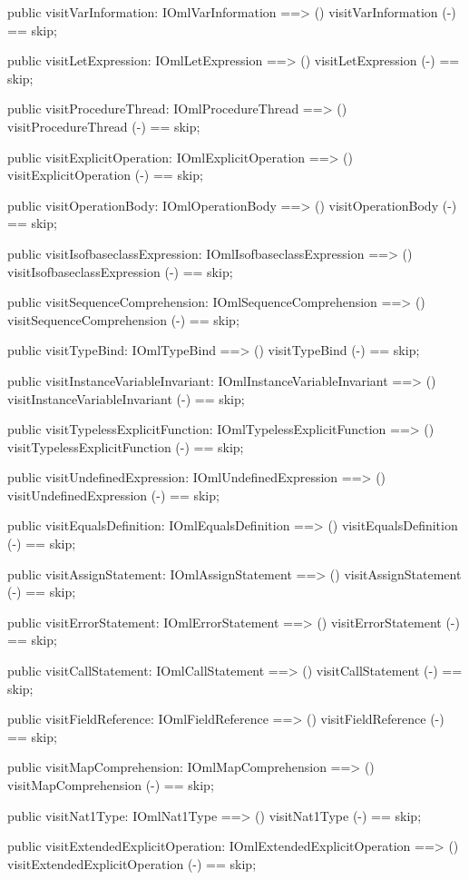 \begin{vdm_al}
  public visitVarInformation: IOmlVarInformation ==> ()
  visitVarInformation (-) == skip;

  public visitLetExpression: IOmlLetExpression ==> ()
  visitLetExpression (-) == skip;

  public visitProcedureThread: IOmlProcedureThread ==> ()
  visitProcedureThread (-) == skip;

  public visitExplicitOperation: IOmlExplicitOperation ==> ()
  visitExplicitOperation (-) == skip;

  public visitOperationBody: IOmlOperationBody ==> ()
  visitOperationBody (-) == skip;

  public visitIsofbaseclassExpression: IOmlIsofbaseclassExpression ==> ()
  visitIsofbaseclassExpression (-) == skip;

  public visitSequenceComprehension: IOmlSequenceComprehension ==> ()
  visitSequenceComprehension (-) == skip;

  public visitTypeBind: IOmlTypeBind ==> ()
  visitTypeBind (-) == skip;

  public visitInstanceVariableInvariant: IOmlInstanceVariableInvariant ==> ()
  visitInstanceVariableInvariant (-) == skip;

  public visitTypelessExplicitFunction: IOmlTypelessExplicitFunction ==> ()
  visitTypelessExplicitFunction (-) == skip;

  public visitUndefinedExpression: IOmlUndefinedExpression ==> ()
  visitUndefinedExpression (-) == skip;

  public visitEqualsDefinition: IOmlEqualsDefinition ==> ()
  visitEqualsDefinition (-) == skip;

  public visitAssignStatement: IOmlAssignStatement ==> ()
  visitAssignStatement (-) == skip;

  public visitErrorStatement: IOmlErrorStatement ==> ()
  visitErrorStatement (-) == skip;

  public visitCallStatement: IOmlCallStatement ==> ()
  visitCallStatement (-) == skip;

  public visitFieldReference: IOmlFieldReference ==> ()
  visitFieldReference (-) == skip;

  public visitMapComprehension: IOmlMapComprehension ==> ()
  visitMapComprehension (-) == skip;

  public visitNat1Type: IOmlNat1Type ==> ()
  visitNat1Type (-) == skip;

  public visitExtendedExplicitOperation: IOmlExtendedExplicitOperation ==> ()
  visitExtendedExplicitOperation (-) == skip;


\end{vdm_al}
